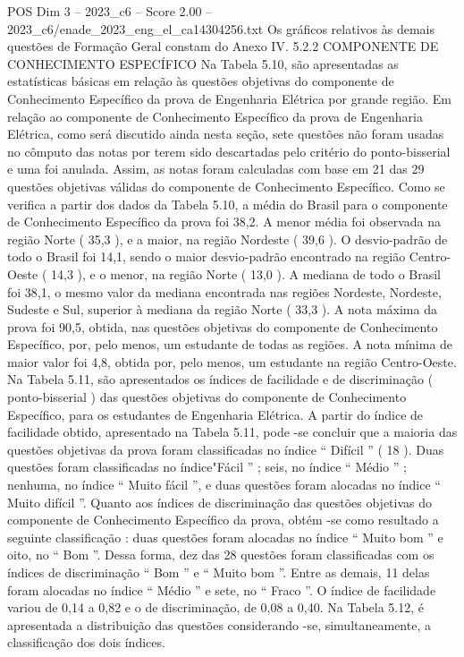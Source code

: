\begin{textsample}{POS Dim 3 – 2023\_c6 – Score 2.00 – 2023\_c6/enade\_2023\_eng\_el\_ca14304256.txt}
Os gráficos relativos às demais questões de Formação Geral constam do Anexo IV. 5.2.2 COMPONENTE DE CONHECIMENTO ESPECÍFICO Na Tabela 5.10, são apresentadas as estatísticas básicas em relação às questões objetivas do componente de Conhecimento Específico da prova de Engenharia Elétrica por grande região.
Em relação ao componente de Conhecimento Específico da prova de Engenharia Elétrica, como será discutido ainda nesta seção, sete questões não foram usadas no cômputo das notas por terem sido descartadas pelo critério do ponto-bisserial e uma foi anulada.
Assim, as notas foram calculadas com base em 21 das 29 questões objetivas válidas do componente de Conhecimento Específico.
Como se verifica a partir dos dados da Tabela 5.10, a média do Brasil para o componente de Conhecimento Específico da prova foi 38,2.
A menor média foi observada na região Norte ( 35,3 ), e a maior, na região Nordeste ( 39,6 ).
O desvio-padrão de todo o Brasil foi 14,1, sendo o maior desvio-padrão encontrado na região Centro-Oeste ( 14,3 ), e o menor, na região Norte ( 13,0 ).
A mediana de todo o Brasil foi 38,1, o mesmo valor da mediana encontrada nas regiões Nordeste, Nordeste, Sudeste e Sul, superior à mediana da região Norte ( 33,3 ).
A nota máxima da prova foi 90,5, obtida, nas questões objetivas do componente de Conhecimento Específico, por, pelo menos, um estudante de todas as regiões.
A nota mínima de maior valor foi 4,8, obtida por, pelo menos, um estudante na região Centro-Oeste.
Na Tabela 5.11, são apresentados os índices de facilidade e de discriminação ( ponto-bisserial ) das questões objetivas do componente de Conhecimento Específico, para os estudantes de Engenharia Elétrica.
A partir do índice de facilidade obtido, apresentado na Tabela 5.11, pode -se concluir que a maioria das questões objetivas da prova foram classificadas no índice “ Difícil ” ( 18 ).
Duas questões foram classificadas no índice"Fácil ” ; seis, no índice “ Médio ” ; nenhuma, no índice “ Muito fácil ”, e duas questões foram alocadas no índice “ Muito difícil ”.
Quanto aos índices de discriminação das questões objetivas do componente de Conhecimento Específico da prova, obtém -se como resultado a seguinte classificação : duas questões foram alocadas no índice “ Muito bom ” e oito, no “ Bom ”.
Dessa forma, dez das 28 questões foram classificadas com os índices de discriminação “ Bom ” e “ Muito bom ”.
Entre as demais, 11 delas foram alocadas no índice “ Médio ” e sete, no “ Fraco ”.
O índice de facilidade variou de 0,14 a 0,82 e o de discriminação, de 0,08 a 0,40.
Na Tabela 5.12, é apresentada a distribuição das questões considerando -se, simultaneamente, a classificação dos dois índices.

\end{textsample}
